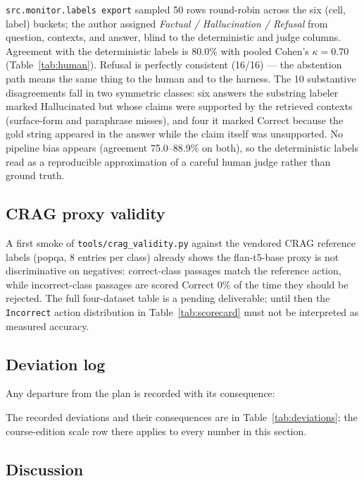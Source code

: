 \texttt{src.monitor.labels export} sampled 50 rows round-robin across the six
(cell, label) buckets; the author assigned \emph{Factual / Hallucination /
Refusal} from question, contexts, and answer, blind to the deterministic and
judge columns. Agreement with the deterministic labels is 80.0\% with pooled
Cohen's $\kappa = 0.70$ (Table~\ref{tab:human}). Refusal is perfectly
consistent (16/16) --- the abstention path means the same thing to the human
and to the harness. The 10 substantive disagreements fall in two symmetric
classes: six answers the substring labeler marked Hallucinated but whose
claims were supported by the retrieved contexts (surface-form and paraphrase
misses), and four it marked Correct because the gold string appeared in the
answer while the claim itself was unsupported. No pipeline bias appears
(agreement 75.0--88.9\% on both), so the deterministic labels read as a
reproducible approximation of a careful human judge rather than ground truth.



\subsection{CRAG proxy validity}

A first smoke of \texttt{tools/crag\_validity.py} against the vendored CRAG
reference labels (popqa, 8 entries per class) already shows the flan-t5-base
proxy is not discriminative on negatives: correct-class passages match the
reference action, while incorrect-class passages are scored Correct 0\% of
the time they should be rejected. The full four-dataset table is a pending
deliverable; until then the \texttt{Incorrect} action distribution in
Table~\ref{tab:scorecard} must not be interpreted as measured accuracy.



\subsection{Deviation log}

Any departure from the plan is recorded with its consequence:



The recorded deviations and their consequences are in
Table~\ref{tab:deviations}; the course-edition scale row there applies to
every number in this section.

\subsection{Discussion}

